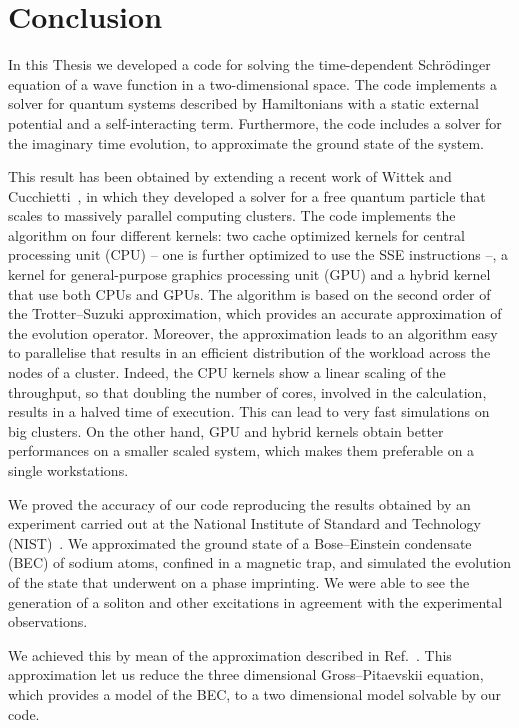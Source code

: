 \chapter{Conclusion}
In this Thesis we developed a code for solving the time-dependent Schr\"odinger equation of a wave function in a two-dimensional space. The code implements a solver for quantum systems described by Hamiltonians with a static external potential and a self-interacting term. Furthermore, the code includes a solver for the imaginary time evolution, to approximate the ground state of the system.

This result has been obtained by extending  a recent work of Wittek and Cucchietti~\citep{Wittek20131165}, in which they developed a solver for a free quantum particle that scales to massively parallel computing clusters. The code implements the algorithm on four different kernels: two cache optimized kernels for central processing unit (CPU) -- one is further optimized to use the SSE instructions --, a kernel for general-purpose graphics processing unit (GPU) and a hybrid kernel that use both CPUs and GPUs. The algorithm is based on the second order of the Trotter--Suzuki approximation, which provides an accurate approximation of the evolution operator. Moreover, the approximation leads to an algorithm easy to parallelise that results in an efficient distribution of the workload across the nodes of a cluster. Indeed, the CPU kernels show a linear scaling of the throughput, so that doubling the number of cores, involved in the calculation, results in a halved time of execution. This can lead to very fast simulations on big clusters. On the other hand, GPU and hybrid kernels obtain better performances on a smaller scaled system, which makes them preferable on a single workstations.

We proved the accuracy of our code reproducing the results obtained by an experiment carried out at the National Institute of Standard and Technology (NIST)~\citep{DSF00}. We approximated the ground state of a Bose--Einstein condensate (BEC) of sodium atoms, confined in a magnetic trap, and simulated the evolution of the state that underwent on a phase imprinting. We were able to see the generation of a soliton and other excitations in agreement with the experimental observations.

We achieved this by mean of the approximation described in Ref.~\citep{PietroMassignan}. This approximation let us reduce the three dimensional Gross--Pitaevskii equation, which provides a model of the BEC, to a two dimensional model solvable by our code.

